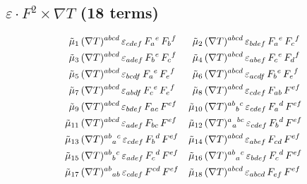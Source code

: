 \documentclass[12pt,a4paper]{article}
\newcommand{\del}{\nabla}            %
\newcommand{\eps}{\varepsilon}       %
\begin{document}
\subsection{$\eps \cdot F^2 \times \del T$ (18 terms)}
{\small
\begin{align}
  \tilde{\mu}_1&\, (\del T)^{abcd}\,\eps_{cdef}\,F_{a}{}^{e}\,F_{b}{}^{f}  &
  \tilde{\mu}_2&\, (\del T)^{abcd}\,\eps_{bdef}\,F_{a}{}^{e}\,F_{c}{}^{f}  \notag\\
  \tilde{\mu}_3&\, (\del T)^{abcd}\,\eps_{adef}\,F_{b}{}^{e}\,F_{c}{}^{f}  &
  \tilde{\mu}_4&\, (\del T)^{abcd}\,\eps_{abef}\,F_{c}{}^{e}\,F_{d}{}^{f}  \notag\\
  \tilde{\mu}_5&\, (\del T)^{abcd}\,\eps_{bcdf}\,F_{a}{}^{e}\,F_{e}{}^{f}  &
  \tilde{\mu}_6&\, (\del T)^{abcd}\,\eps_{acdf}\,F_{b}{}^{e}\,F_{e}{}^{f}  \notag\\
  \tilde{\mu}_7&\, (\del T)^{abcd}\,\eps_{abdf}\,F_{c}{}^{e}\,F_{e}{}^{f}  &
  \tilde{\mu}_8&\, (\del T)^{abcd}\,\eps_{cdef}\,F_{ab}\,F^{ef}  \notag\\
  \tilde{\mu}_9&\, (\del T)^{abcd}\,\eps_{bdef}\,F_{ac}\,F^{ef}  &
  \tilde{\mu}_{10}&\, (\del T)^{ab}{}_{b}{}^{c}\,\eps_{cdef}\,F_{a}{}^{d}\,F^{ef}  \notag\\
  \tilde{\mu}_{11}&\, (\del T)^{abcd}\,\eps_{adef}\,F_{bc}\,F^{ef}  &
  \tilde{\mu}_{12}&\, (\del T)^{a}{}_{a}{}^{bc}\,\eps_{cdef}\,F_{b}{}^{d}\,F^{ef}  \notag\\
  \tilde{\mu}_{13}&\, (\del T)^{ab}{}_{a}{}^{c}\,\eps_{cdef}\,F_{b}{}^{d}\,F^{ef}  &
  \tilde{\mu}_{14}&\, (\del T)^{abcd}\,\eps_{abef}\,F_{cd}\,F^{ef}  \notag\\
  \tilde{\mu}_{15}&\, (\del T)^{ab}{}_{b}{}^{c}\,\eps_{adef}\,F_{c}{}^{d}\,F^{ef}  &
  \tilde{\mu}_{16}&\, (\del T)^{ab}{}_{a}{}^{c}\,\eps_{bdef}\,F_{c}{}^{d}\,F^{ef}  \notag\\
  \tilde{\mu}_{17}&\, (\del T)^{ab}{}_{ab}\,\eps_{cdef}\,F^{cd}\,F^{ef}  &
  \tilde{\mu}_{18}&\, (\del T)^{abcd}\,\eps_{abcd}\,F_{ef}\,F^{ef}
  \label{eq:eps_ffdt_explicit}
\end{align}
}
\end{document}
